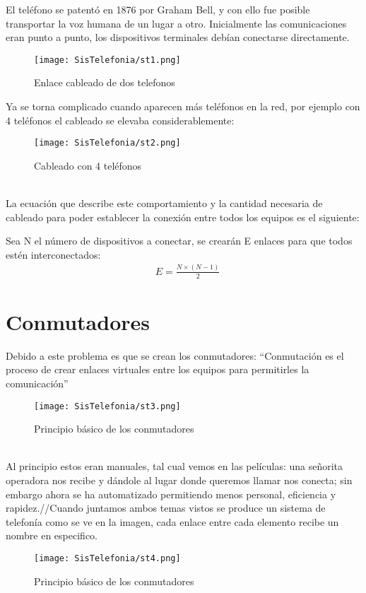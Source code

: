 \documentclass[11pt,fleqn]{book} %
\begin{document}
El teléfono se patentó en 1876 por Graham Bell, y con ello fue posible transportar la voz humana de un lugar a otro.
Inicialmente las comunicaciones eran punto a punto, los dispositivos terminales debían conectarse directamente. 
\begin{figure}[h]
\centering\texttt{[image: SisTelefonia/st1.png]}
\caption{Enlace cableado de dos telefonos}
\label{fig:enlace básico telefónico}
\end{figure}
Ya se torna complicado cuando aparecen más teléfonos en la red, por ejemplo con 4 teléfonos el cableado se elevaba considerablemente:
\begin{figure}[h]
\centering\texttt{[image: SisTelefonia/st2.png]}
\caption{Cableado con 4 teléfonos}
\label{fig:Cableado con 4 teléfonos}
\end{figure}
\\La ecuación que describe este comportamiento y la cantidad necesaria de cableado para poder establecer la conexión entre todos los equipos es el siguiente:
\begin{theorem}
Sea N el número de dispositivos a conectar, se crearán E enlaces para que todos estén interconectados:
\begin{align}
& E=\frac{N\times(N-1)}{2}
\end{align}
\end{theorem}
\section{Conmutadores}
Debido a este problema es que se crean los conmutadores: “Conmutación es el proceso de crear enlaces virtuales entre los equipos para permitirles la comunicación”
\begin{figure}[h]
\centering\texttt{[image: SisTelefonia/st3.png]}
\caption{Principio básico de los conmutadores}
\label{fig:Principio básico de los conmutadores}
\end{figure}
\\Al principio estos eran manuales, tal cual vemos en las películas: una señorita operadora nos recibe y dándole al lugar donde queremos llamar nos conecta; sin embargo ahora se ha automatizado permitiendo menos personal, eficiencia y rapidez.//Cuando juntamos ambos temas vistos se produce un sistema de telefonía como se ve en la imagen, cada enlace entre cada elemento recibe un nombre en especifico.
\begin{figure}[h]
\centering\texttt{[image: SisTelefonia/st4.png]}
\caption{Principio básico de los conmutadores}
\label{fig:Principio básico de los conmutadores}
\end{figure}
\end{document}
